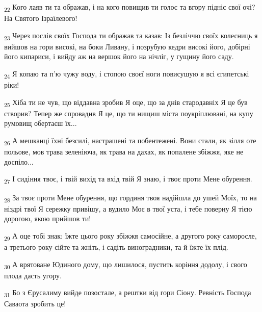 \begin{tcolorbox}
\textsubscript{22} Кого лаяв ти та ображав, і на кого повищив ти голос та вгору підніс свої очі? На Святого Ізраїлевого!
\end{tcolorbox}
\begin{tcolorbox}
\textsubscript{23} Через послів своїх Господа ти ображав та казав: Із безліччю своїх колесниць я вийшов на гори високі, на боки Ливану, і позрубую кедри високі його, добірні його кипариси, і вийду аж на вершок його на нічліг, у гущину його саду.
\end{tcolorbox}
\begin{tcolorbox}
\textsubscript{24} Я копаю та п'ю чужу воду, і стопою своєї ноги повисушую я всі єгипетські ріки!
\end{tcolorbox}
\begin{tcolorbox}
\textsubscript{25} Хіба ти не чув, що віддавна зробив Я оце, що за днів стародавніх Я це був створив? Тепер же спровадив Я це, що ти нищиш міста поукріплювані, на купу румовищ обертаєш їх...
\end{tcolorbox}
\begin{tcolorbox}
\textsubscript{26} А мешканці їхні безсилі, настрашені та побентежені. Вони стали, як зілля оте польове, мов трава зеленіюча, як трава на дахах, як попалене збіжжя, яке не доспіло...
\end{tcolorbox}
\begin{tcolorbox}
\textsubscript{27} І сидіння твоє, і твій вихід та вхід твій Я знаю, і твоє проти Мене обурення.
\end{tcolorbox}
\begin{tcolorbox}
\textsubscript{28} За твоє проти Мене обурення, що гординя твоя надійшла до ушей Моїх, то на ніздрі твої Я сережку привішу, а вудило Моє в твої уста, і тебе поверну Я тією дорогою, якою прийшов ти!
\end{tcolorbox}
\begin{tcolorbox}
\textsubscript{29} А оце тобі знак: їжте цього року збіжжя самосійне, а другого року саморосле, а третього року сійте та жніть, і садіть виноградники, та й їжте їх плід.
\end{tcolorbox}
\begin{tcolorbox}
\textsubscript{30} А врятоване Юдиного дому, що лишилося, пустить коріння додолу, і свого плода дасть угору.
\end{tcolorbox}
\begin{tcolorbox}
\textsubscript{31} Бо з Єрусалиму вийде позостале, а рештки від гори Сіону. Ревність Господа Саваота зробить це!
\end{tcolorbox}
